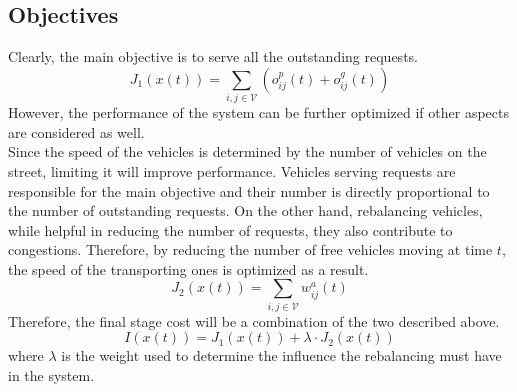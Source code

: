 \subsection{Objectives}
Clearly, the main objective is to serve all the outstanding requests. 
\begin{equation}
	J_1(x(t)) = \sum_{i,j \in \mathcal{V}}(o^p_{ij}(t) + o^g_{ij}(t))\label{eq:no_request_left}
\end{equation}
However, the performance of the system can be further optimized if other aspects are considered as well. \\
Since the speed of the vehicles is determined by the number of vehicles on the street, limiting it will improve performance. Vehicles serving requests are responsible for the main objective and their number is directly proportional to the number of outstanding requests. On the other hand, rebalancing vehicles, while helpful in reducing the number of requests, they also contribute to congestions. Therefore, by reducing the number of free vehicles moving at time $t$, the speed of the transporting ones is optimized as a result. 
\begin{equation}
	J_2(x(t)) = \sum_{i,j \in \mathcal{V}}w^a_{ij}(t) %
\end{equation}
Therefore, the final stage cost will be a combination of the two described above. 
\begin{equation}
	I(x(t)) = J_1(x(t)) + \lambda \cdot J_2(x(t)) 
\end{equation}
where $\lambda$ is the weight used to determine the influence the rebalancing must have in the system.
